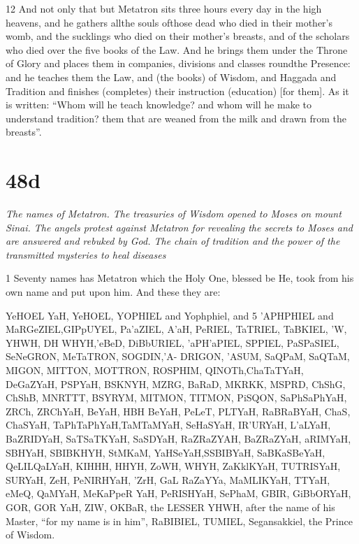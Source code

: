 \par 12 And not only that but Metatron sits three hours every day in the high heavens, and he gathers allthe souls ofthose dead who died in their mother's womb, and the sucklings who died on their mother's breasts, and of the scholars who died over the five books of the Law. And he brings them under the Throne of Glory and places them in companies, divisions and classes roundthe Presence: and he teaches them the Law, and (the books) of Wisdom, and Haggada and Tradition and finishes (completes) their instruction (education) [for them]. As it is written: “Whom will he teach knowledge? and whom will he make to understand tradition? them that are weaned from the milk and drawn from the breasts”. 


\chapter{48d}

\par \textit{The names of Metatron. The treasuries of Wisdom opened to Moses on mount Sinai. The angels protest against Metatron for revealing the secrets to Moses and are answered and rebuked by God. The chain of tradition and the power of the transmitted mysteries to heal diseases}

\par 1 Seventy names has Metatron which the Holy One, blessed be He, took from his own name and put upon him. And these they are: 

\par YeHOEL YaH, YeHOEL, YOPHIEL and Yophphiel, and 5 'APHPHIEL and MaRGeZIEL,GIPpUYEL, Pa'aZIEL, A'aH, PeRIEL, TaTRIEL, TaBKIEL, 'W, YHWH, DH WHYH,'eBeD, DiBbURIEL, 'aPH'aPIEL, SPPIEL, PaSPaSIEL, SeNeGRON, MeTaTRON, SOGDIN,'A- DRIGON, 'ASUM, SaQPaM, SaQTaM, MIGON, MITTON, MOTTRON, ROSPHIM, QINOTh,ChaTaTYaH, DeGaZYaH, PSPYaH, BSKNYH, MZRG, BaRaD, MKRKK, MSPRD, ChShG, ChShB, MNRTTT, BSYRYM, MITMON, TITMON, PiSQON, SaPhSaPhYaH, ZRCh, ZRChYaH, BeYaH, HBH BeYaH, PeLeT, PLTYaH, RaBRaBYaH, ChaS, ChaSYaH, TaPhTaPhYaH,TaMTaMYaH, SeHaSYaH, IR'URYaH, L'aLYaH, BaZRIDYaH, SaTSaTKYaH, SaSDYaH, RaZRaZYAH, BaZRaZYaH, aRIMYaH, SBHYaH, SBIBKHYH, StMKaM, YaHSeYaH,SSBIBYaH, SaBKaSBeYaH, QeLILQaLYaH, KIHHH, HHYH, ZoWH, WHYH, ZaKklKYaH, TUTRISYaH, SURYaH, ZeH, PeNIRHYaH, 'ZrH, GaL RaZaYYa, MaMLIKYaH, TTYaH, eMeQ, QaMYaH, MeKaPpeR YaH, PeRISHYaH, SePhaM, GBIR, GiBbORYaH, GOR, GOR YaH, ZIW, OKBaR, the LESSER YHWH, after the name of his Master, “for my name is in him”, RaBIBIEL, TUMIEL, Segansakkiel, the Prince of Wisdom. 

